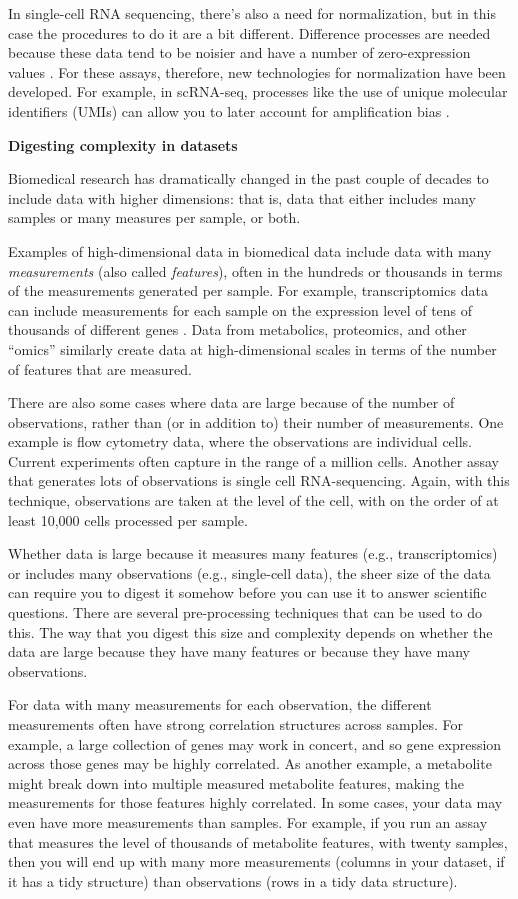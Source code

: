 \documentclass[]{tufte-book}
\begin{document}
In single-cell RNA sequencing, there's also a need for normalization, but in
this case the procedures to do it are a bit different. Difference processes are
needed because these data tend to be noisier and have a number of
zero-expression values \citep{perkel2017single, bacher2017scnorm}. For these assays, therefore, new technologies for
normalization have been developed. For example, in scRNA-seq, processes like the
use of unique molecular identifiers (UMIs) can allow you to later account for
amplification bias \citep{haque2017practical}.

\textbf{Digesting complexity in datasets}

Biomedical research has dramatically changed in the past couple of decades to
include data with higher dimensions: that is, data that either includes many
samples or many measures per sample, or both.

Examples of high-dimensional data in biomedical data include data with many
\emph{measurements} (also called \emph{features}), often in the hundreds or thousands in
terms of the measurements generated per sample. For example, transcriptomics
data can include measurements for each sample on the expression level of tens of
thousands of different genes \citep{perkel2017single}. Data from metabolics,
proteomics, and other ``omics'' similarly create data at high-dimensional scales
in terms of the number of features that are measured.

There are also some cases where data are large because of the number of
observations, rather than (or in addition to) their number of measurements. One
example is flow cytometry data, where the observations are individual cells.
Current experiments often capture in the range of a million cells. Another assay
that generates lots of observations is single cell RNA-sequencing. Again, with
this technique, observations are taken at the level of the cell, with on the
order of at least 10,000 cells processed per sample.

Whether data is large because it measures many features (e.g., transcriptomics)
or includes many observations (e.g., single-cell data), the sheer size of the
data can require you to digest it somehow before you can use it to answer
scientific questions. There are several pre-processing techniques that can be
used to do this. The way that you digest this size and complexity depends on
whether the data are large because they have many features or because they have
many observations.

For data with many measurements for each observation, the different measurements
often have strong correlation structures across samples. For example, a large
collection of genes may work in concert, and so gene expression across those
genes may be highly correlated. As another example, a metabolite might break
down into multiple measured metabolite features, making the measurements for
those features highly correlated. In some cases, your data may even have more
measurements than samples. For example, if you run an assay that measures the
level of thousands of metabolite features, with twenty samples, then you will
end up with many more measurements (columns in your dataset, if it has a tidy
structure) than observations (rows in a tidy data structure).
\end{document}
